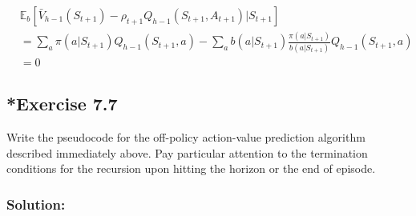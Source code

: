 \begin{align*}
    &\mathbb{E}_b \left[ \bar{V}_{h-1}(S_{t+1}) - \rho_{t+1} Q_{h-1}(S_{t+1}, A_{t+1}) \big| S_{t+1} \right] \\
    &= \sum_a \pi(a | S_{t+1}) Q_{h-1}(S_{t+1}, a) - \sum_a b(a | S_{t+1}) \frac{\pi(a | S_{t+1})}{b(a | S_{t+1})} Q_{h-1}(S_{t+1}, a) \\
    &= 0
\end{align*}

\subsection*{*Exercise 7.7}
Write the pseudocode for the off-policy action-value prediction algorithm
described immediately above. Pay particular attention to the termination conditions for
the recursion upon hitting the horizon or the end of episode.

\subsubsection*{Solution:}

